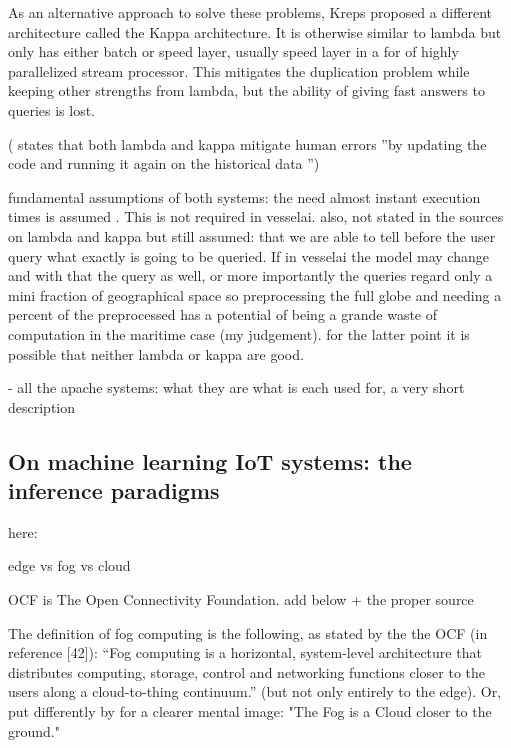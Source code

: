 As an alternative approach to solve these problems, Kreps proposed a different architecture called the Kappa architecture. It is otherwise similar to lambda but only has either batch or speed layer, usually speed layer in a for of highly parallelized stream processor. This mitigates the duplication problem while keeping other strengths from lambda, but the ability of giving fast answers to queries is lost.

(\cite{D1.1} states that both lambda and kappa mitigate human errors ''by  updating  the  code  and  running  it  again  on  the historical  data '')


fundamental assumptions of both systems:  the need almost instant execution times is assumed \cite{lambdakappa}. This is not required in vesselai. also, not stated in the sources on lambda and kappa but still assumed: that we are able to tell before the user query what exactly is going to be queried. If in vesselai the model may change and with that the query as well, or more importantly the queries regard only a mini fraction of geographical space so preprocessing the full globe and needing a percent of the preprocessed has a potential of being a grande waste of computation in the maritime case (my judgement). for the latter point it is possible that neither lambda or kappa are good.

- all the apache systems: what they are what is each used for, a very short description

\subsection{On machine learning IoT systems: the inference paradigms}

here:

edge vs fog vs cloud

OCF is The Open Connectivity Foundation. add below + the proper source

The definition of fog computing is the following, as stated by the the OCF (in \cite{fogsurvey} reference [42]): “Fog computing is a horizontal, system-level architecture that distributes computing, storage, control and networking functions closer to the users along a cloud-to-thing continuum.” (but not only entirely to the edge). Or, put differently by \cite{fogsurvey} for a clearer mental image: "The Fog is a Cloud closer to the ground."



